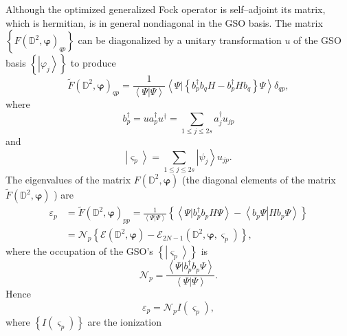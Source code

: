 \documentclass[aps,preprint]{revtex4}%
\begin{document}
Although the optimized generalized Fock operator is self--adjoint its matrix,
which is hermitian, is in general nondiagonal in the GSO basis. The matrix
$\left\{  F\left(  \mathbb{D}^{2},\boldsymbol{\varphi}\right)  _{qp}\right\}
$ can be diagonalized by a unitary transformation $u$ of the GSO basis
$\left\{  \left\vert \varphi_{j}\right\rangle \right\}  $ to produce
\begin{equation}
\tilde{F}\left(  \mathbb{D}^{2},\boldsymbol{\varphi}\right)  _{qp}=\frac
{1}{\left\langle \left.  \Psi\right\vert \Psi\right\rangle }\left\langle
\left.  \Psi\right\vert \left\{  b_{p}^{\dagger}b_{q}H-b_{p}^{\dagger}%
Hb_{q}\right\}  \Psi\right\rangle \delta_{qp},
\end{equation}
where
\begin{equation}
b_{p}^{\dagger}=ua_{p}^{\dagger}u^{\dagger}=\sum_{1\leq j\leq2s}a_{j}%
^{\dagger}u_{jp}%
\end{equation}
and
\begin{equation}
\left\vert \varsigma_{p}\right\rangle =\sum_{1\leq j\leq2s}\left\vert \psi
_{j}\right\rangle u_{jp}.
\end{equation}
The eigenvalues of the matrix $F\left(  \mathbb{D}^{2},\boldsymbol{\varphi
}\right)  $ (the diagonal elements of the matrix $\tilde{F}\left(
\mathbb{D}^{2},\boldsymbol{\varphi}\right)  $ ) are
\begin{align}
\varepsilon_{p}  &  =\tilde{F}\left(  \mathbb{D}^{2},\boldsymbol{\varphi
}\right)  _{pp}=\frac{1}{\left\langle \left.  \Psi\right\vert \Psi
\right\rangle }\left\{  \left\langle \left.  \Psi\right\vert b_{p}^{\dagger
}b_{p}H\Psi\right\rangle -\left\langle \left.  b_{p}\Psi\right\vert Hb_{p}%
\Psi\right\rangle \right\} \nonumber\\
&  =\mathcal{N}_{p}\left\{  \mathcal{E}\left(  \mathbb{D}^{2}%
,\boldsymbol{\varphi}\right)  -\mathcal{E}_{2N-1}\left(  \mathbb{D}%
^{2},\boldsymbol{\varphi,}\varsigma_{p}\right)  \right\}  ,
\end{align}
where the occupation of the GSO's $\left\{  \left\vert \varsigma
_{p}\right\rangle \right\}  $ is
\begin{equation}
\mathcal{N}_{p}=\frac{\left\langle \left.  \Psi\right\vert b_{p}^{\dagger
}b_{p}\Psi\right\rangle }{\left\langle \left.  \Psi\right\vert \Psi
\right\rangle }.
\end{equation}
Hence
\begin{equation}
\varepsilon_{p}=\mathcal{N}_{p}I\left(  \varsigma_{p}\right)  ,
\end{equation}
where $\left\{  I\left(  \varsigma_{p}\right)  \right\}  $ are the ionization
\end{document}
